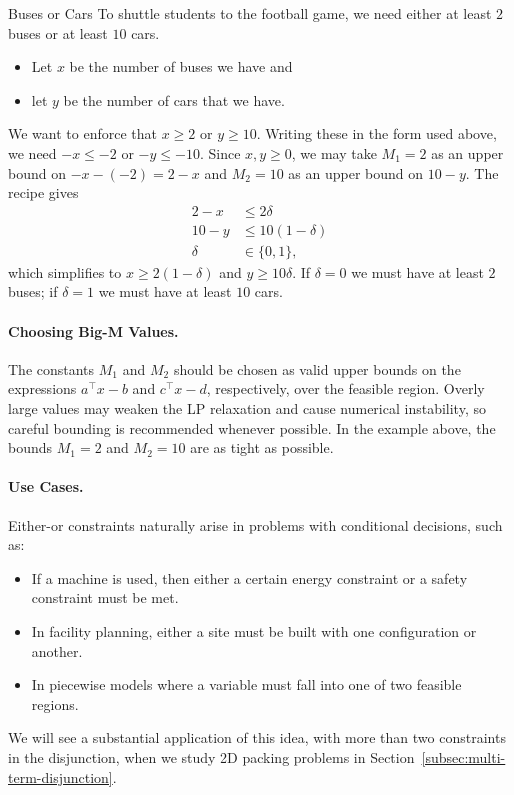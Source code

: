 \begin{example}{Buses or Cars}{}
To shuttle students to the football game, we need either at least $2$ buses or at least $10$ cars.
\begin{itemize}
\item Let $x$ be the number of buses we have and
\item let $y$ be the number of cars that we have.
\end{itemize}
We want to enforce that $x \geq 2$ or $y \geq 10$.  Writing these in the form used above, we need $-x \leq -2$ or $-y \leq -10$.  Since $x, y \geq 0$, we may take $M_1 = 2$ as an upper bound on $-x - (-2) = 2 - x$ and $M_2 = 10$ as an upper bound on $10 - y$.  The recipe gives
\begin{equation}
\begin{split}
2 - x &\leq 2\delta\\
10 - y &\leq 10 (1-\delta)\\
\delta &\in \{0,1\},
\end{split}
\end{equation}
which simplifies to $x \geq 2(1-\delta)$ and $y \geq 10\delta$.  If $\delta = 0$ we must have at least $2$ buses; if $\delta = 1$ we must have at least $10$ cars.
\end{example}

\paragraph{Choosing Big-M Values.}
\label{par:choosing-big-M}
The constants \(M_1\) and \(M_2\) should be chosen as valid upper bounds on the expressions \(a^\top x - b\) and \(c^\top x - d\), respectively, over the feasible region. Overly large values may weaken the LP relaxation and cause numerical instability, so careful bounding is recommended whenever possible.  In the example above, the bounds $M_1 = 2$ and $M_2 = 10$ are as tight as possible.

\paragraph{Use Cases.}
Either-or constraints naturally arise in problems with conditional decisions, such as:
\begin{itemize}
    \item If a machine is used, then either a certain energy constraint or a safety constraint must be met.
    \item In facility planning, either a site must be built with one configuration or another.
    \item In piecewise models where a variable must fall into one of two feasible regions.
\end{itemize}
We will see a substantial application of this idea, with more than two constraints in the disjunction, when we study 2D packing problems in Section~\ref{subsec:multi-term-disjunction}.
